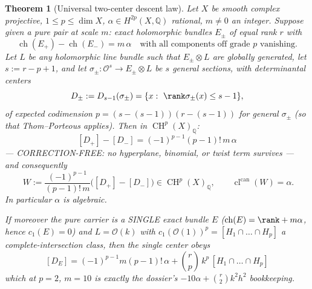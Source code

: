 \documentclass[11pt]{article}
\newtheorem{theorem}{Theorem}
\theoremstyle{definition}
\newcommand{\ch}{\operatorname{ch}}
\newcommand{\cl}{\operatorname{cl}^{\operatorname{can}}}
\newcommand{\CH}{\operatorname{CH}}
\newcommand{\tensor}{\otimes}
\newcommand{\Oo}{\mathcal O}
\begin{document}
\begin{theorem}[Universal two-center descent law]
\label{th:law}
Let $X$ be smooth complex projective, $1\le p\le\dim X$,
$\alpha\in H^{2p}(X,\mathbb Q)$ rational, $m\ne0$ an integer. Suppose
given a \emph{pure pair at scale $m$}: exact holomorphic bundles
$E_\pm$ of equal rank $r$ with
\begin{equation}
\ch(E_+)-\ch(E_-)=m\,\alpha
\quad\text{with all components off grade $p$ vanishing.}
\label{eq:pair}
\end{equation}
Let $L$ be any holomorphic line bundle such that $E_\pm\tensor L$ are
globally generated, let $s:=r-p+1$, and let
$\sigma_\pm:\Oo^{s}\to E_\pm\tensor L$ be $s$ general sections, with
determinantal centers
\[
D_\pm:=D_{s-1}(\sigma_\pm)=\{x:\ \rank\sigma_\pm(x)\le s-1\},
\]
of expected codimension $p=(s-(s-1))(r-(s-1))$ for general
$\sigma_\pm$ (so that Thom--Porteous applies). Then in $\CH^p(X)_{\mathbb Q}$:
\begin{equation}
\boxed{\;[D_+]-[D_-]=(-1)^{p-1}(p-1)!\,m\,\alpha\;}
\label{eq:pairlaw}
\end{equation}
--- CORRECTION-FREE: no hyperplane, binomial, or twist term survives
--- and consequently
\begin{equation}
\boxed{\;
W:=\frac{(-1)^{p-1}}{(p-1)!\,m}\bigl([D_+]-[D_-]\bigr)\in\CH^p(X)_{\mathbb Q},
\qquad \cl(W)=\alpha .}
\label{eq:output}
\end{equation}
In particular $\alpha$ is algebraic.

If moreover the pure carrier is a SINGLE exact bundle $E$
($\ch(E)=\rank+m\alpha$, hence $c_1(E)=0$) and $L=\Oo(k)$ with
$c_1(\Oo(1))^{p}=[H_1\cap\dots\cap H_p]$ a complete-intersection
class, then the single center obeys
\begin{equation}
\boxed{\;[D_E]=(-1)^{p-1}m(p-1)!\,\alpha
+\binom{r}{p}\,k^{p}\,[H_1\cap\dots\cap H_p]\;}
\label{eq:single}
\end{equation}
which at $p=2$, $m=10$ is exactly the dossier's
$-10\alpha+\binom r2k^2h^2$ bookkeeping.
\end{theorem}
\end{document}
